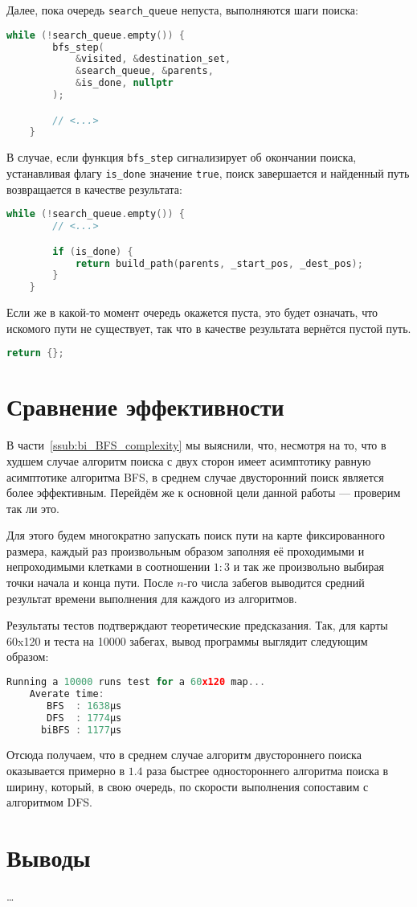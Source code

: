 \documentclass[a4paper, 12pt]{article}
\begin{document}
Далее, пока очередь \verb|search_queue| непуста, выполняются шаги поиска:
\begin{lstlisting}[language=C++]
    while (!search_queue.empty()) {
        bfs_step(
            &visited, &destination_set,
            &search_queue, &parents,
            &is_done, nullptr
        );

        // <...>
    }
\end{lstlisting}

В случае, если функция \verb|bfs_step| сигнализирует об окончании поиска, устанавливая флагу \verb|is_done| значение \verb|true|, поиск завершается и найденный путь возвращается в качестве результата:
\begin{lstlisting}[language=C++]
    while (!search_queue.empty()) {
        // <...>

        if (is_done) {
            return build_path(parents, _start_pos, _dest_pos);
        }
    }
\end{lstlisting}

Если же в какой-то момент очередь окажется пуста, это  будет означать, что искомого пути не существует, так что в качестве результата вернётся пустой путь.
\begin{lstlisting}[language=C++]
    return {};
\end{lstlisting}

\section{Сравнение эффективности}
В части~\ref{ssub:bi_BFS_complexity} мы выяснили, что, несмотря на то, что в худшем случае алгоритм поиска с двух сторон имеет асимптотику равную асимптотике алгоритма BFS, в среднем случае двусторонний поиск является более эффективным. Перейдём же к основной цели данной работы --- проверим так ли это.

Для этого будем многократно запускать поиск пути на карте фиксированного размера, каждый раз произвольным образом заполняя её проходимыми и непроходимыми клетками в соотношении \({ 1 : 3 }\) и так же произвольно выбирая точки начала и конца пути. После \({ n }\)-го числа забегов выводится средний результат времени выполнения для каждого из алгоритмов.

Результаты тестов подтверждают теоретические предсказания. Так, для карты 60x120 и теста на 10000 забегах, вывод программы выглядит следующим образом:
\begin{lstlisting}[language=C++]
    Running a 10000 runs test for a 60x120 map...
    Averate time:
       BFS  : 1638µs
       DFS  : 1774µs
      biBFS : 1177µs
\end{lstlisting}

Отсюда получаем, что в среднем случае алгоритм двустороннего поиска оказывается примерно в \({ 1.4 }\) раза быстрее одностороннего алгоритма поиска в ширину, который, в свою очередь, по скорости выполнения сопоставим с алгоритмом DFS.

\section{Выводы}
\ldots
\end{document}
